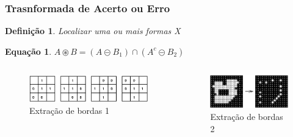 \documentclass[aspectratio=169]{beamer}
\theoremstyle{Definition}
\newtheorem{defn}{Defini\c c\~ao}
\newtheorem{eq}[theorem]{Equa\c c\~ao}
\begin{document}
\begin{frame}
	\frametitle{Trasnformada de Acerto ou Erro}
	
	\begin{defn}
    	Localizar uma ou mais formas X
	\end{defn}
	
	\begin{eq}
    	$ A \circledast B = (A \circleddash B_1) \cap (A^c \circleddash B_2) $ 
	\end{eq}
	
	\begin{columns}
		\begin{column}{0.6\textwidth}
			\begin{figure}[h]
	  		 	\includegraphics[width=6cm, height=0.25\paperheight]{imagens/hitnmiss3}
				\caption{Extração de bordas 1}\label{figHitnMiss1}
			\end{figure}
		\end{column}
		\begin{column}{0.4\textwidth}
			\begin{figure}[h]
			   	\includegraphics[width=4cm, height=0.25\paperheight]{imagens/hitnmiss2}
				\caption{Extração de bordas 2}\label{figHitnMiss2}
			\end{figure}
		\end{column}
	\end{columns}
	
\end{frame}
\end{document}
